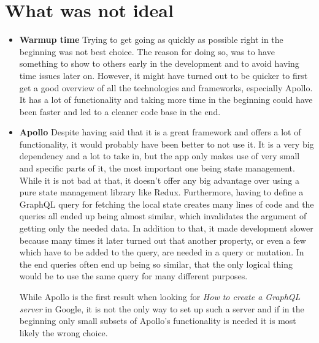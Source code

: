 \section{What was not ideal}
\begin{itemize}
\item \textbf{Warmup time} Trying to get going as quickly as possible right in the beginning was not best choice. The reason for doing so, was to have something to show to others early in the development and to avoid having time issues later on. However, it might have turned out to be quicker to first get a good overview of all the technologies and frameworks, especially Apollo. It has a lot of functionality and taking more time in the beginning could have been faster and led to a cleaner code base in the end.

\item \textbf{Apollo} Despite having said that it is a great framework and offers a lot of functionality, it would probably have been better to not use it. It is a very big dependency and a lot to take in, but the app only makes use of very small and specific parts of it, the most important one being state management. While it is not bad at that, it doesn't offer any big advantage over using a pure state management library like Redux. Furthermore, having to define a GraphQL query for fetching the local state creates many lines of code and the queries all ended up being almost similar, which invalidates the argument of getting only the needed data. In addition to that, it made development slower because many times it later turned out that another property, or even a few which have to be added to the query, are needed in a query or mutation. In the end queries often end up being so similar, that the only logical thing would be to use the same query for many different purposes.

While Apollo is the first result when looking for \emph{How to create a GraphQL server} in Google, it is not the only way to set up such a server and if in the beginning only small subsets of Apollo's functionality is needed it is most likely the wrong choice.
\end{itemize}



